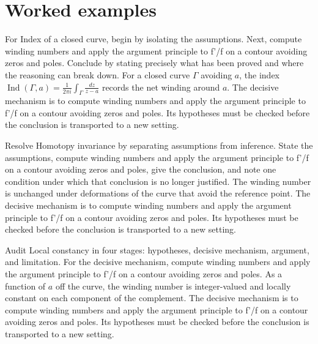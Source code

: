 \section{Worked examples}

\begin{example}\label{ex:iv12-worked-01}
For Index of a closed curve, begin by isolating the assumptions. Next, compute winding numbers and apply the argument principle to f'/f on a contour avoiding zeros and poles. Conclude by stating precisely what has been proved and where the reasoning can break down. For a closed curve $\Gamma$ avoiding $a$, the index $\operatorname{Ind}(\Gamma,a)=\frac{1}{2\pi i}\int_\Gamma \frac{dz}{z-a}$ records the net winding around $a$. The decisive mechanism is to compute winding numbers and apply the argument principle to f'/f on a contour avoiding zeros and poles. Its hypotheses must be checked before the conclusion is transported to a new setting.
\end{example}

\begin{example}\label{ex:iv12-worked-02}
Resolve Homotopy invariance by separating assumptions from inference. State the assumptions, compute winding numbers and apply the argument principle to f'/f on a contour avoiding zeros and poles, give the conclusion, and note one condition under which that conclusion is no longer justified. The winding number is unchanged under deformations of the curve that avoid the reference point. The decisive mechanism is to compute winding numbers and apply the argument principle to f'/f on a contour avoiding zeros and poles. Its hypotheses must be checked before the conclusion is transported to a new setting.
\end{example}

\begin{example}\label{ex:iv12-worked-03}
Audit Local constancy in four stages: hypotheses, decisive mechanism, argument, and limitation. For the decisive mechanism, compute winding numbers and apply the argument principle to f'/f on a contour avoiding zeros and poles. As a function of $a$ off the curve, the winding number is integer-valued and locally constant on each component of the complement. The decisive mechanism is to compute winding numbers and apply the argument principle to f'/f on a contour avoiding zeros and poles. Its hypotheses must be checked before the conclusion is transported to a new setting.
\end{example}

